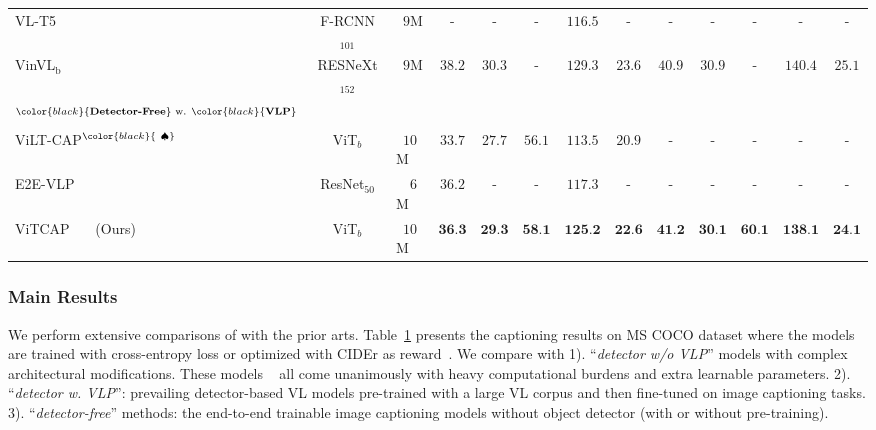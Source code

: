 \begin{table}[t]
{\begin{tabular}{p{24mm} c p{9mm}  c c c c  c c c c c c}
{\cellcolor{black!3}VL-T5} & F-RCNN$_{101}$ & \ $9$M & - & - & - &  $116.5$ & - & - & - & - & - & -\\
{\cellcolor{black!3}VinVL$_\text{b}$}        & RESNeXt$_{152}$ & \ $9$M  & $38.2$ & $30.3$ & - & $129.3$ & $23.6$ & \textbf{$40.9$} & \textbf{$30.9$} & - & \textbf{$140.4$} & \textbf{$25.1$} \\
\hline \\[-2ex]
{$^{{\color{black}{\text{\textbf{Detector-Free}}}}\text{ w. }\color{black}{\text{\textbf{VLP}}}}$} & & & & & & & & & & \\[-6pt]
{\cellcolor{black!3}ViLT-CAP$^{\color{black}{\ \spadesuit}}$}  & ViT$_{b}$ & \ $10$M & $33.7$ & $27.7$ & $56.1$ & $113.5$ & $20.9$ & - & - & - & - & - \\
{\cellcolor{black!3}E2E-VLP} & ResNet$_{50}$ & \ \ $6$M & $36.2$ & - & - & $117.3$ & - & - & - & - & - & - \\
{\cellcolor{black!3}ViTCAP \ \ \ (Ours)} & ViT$_{b}$  & \ $10$M & $\textbf{36.3}$ & $\textbf{29.3}$ & $\textbf{58.1}$ & $\textbf{125.2}$ & $\textbf{22.6}$ & $\textbf{41.2}$ & $\textbf{30.1}$ & $\textbf{60.1}$ & $\textbf{138.1}$ & $\textbf{24.1}$\\
\bottomrule
\end{tabular}
}
\label{tab:COCO}
\end{table}


\subsubsection{Main Results}
We perform extensive comparisons of \vitcap with the prior arts. Table~\ref{tab:COCO} presents the captioning results on MS COCO dataset where the models are trained with cross-entropy loss or optimized with CIDEr as reward~\citep{rennie2017self}. 
We compare \vitcap with 1). ``\textit{detector w/o VLP}'' models with complex architectural modifications. These models ~\citep{huang2019attention,cornia2020meshed,pan2020x,zhang2021rstnet} all come unanimously with heavy computational burdens and extra learnable parameters. 2). ``\textit{detector w. VLP}'': prevailing detector-based VL models pre-trained with a large VL corpus and then fine-tuned on image captioning tasks. 3). ``\textit{detector-free}'' methods: the end-to-end trainable image captioning models without object detector (with or without pre-training).


